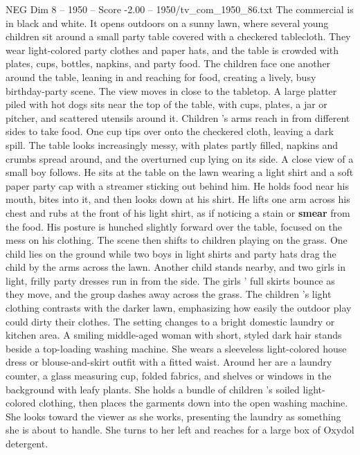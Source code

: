\begin{textsample}{NEG Dim 8 – 1950 – Score -2.00 – 1950/tv\_com\_1950\_86.txt}  \label{ex:f8_neg_028}
The commercial is in black and white.
It opens outdoors on a sunny lawn, where several young children sit around a small party table covered with a checkered tablecloth.
They wear light-colored party clothes and paper hats, and the table is crowded with plates, cups, bottles, napkins, and party food.
The children face one another around the table, leaning in and reaching for food, creating a lively, busy birthday-party scene.
The view moves in close to the tabletop.
A large platter piled with hot dogs sits near the top of the table, with cups, plates, a jar or pitcher, and scattered utensils around it.
Children ’s arms reach in from different sides to take food.
One cup tips over onto the checkered cloth, leaving a dark spill.
The table looks increasingly messy, with plates partly filled, napkins and crumbs spread around, and the overturned cup lying on its side.
A close view of a small boy follows.
He sits at the table on the lawn wearing a light shirt and a soft paper party cap with a streamer sticking out behind him.
He holds food near his mouth, bites into it, and then looks down at his shirt.
He lifts one arm across his chest and rubs at the front of his light shirt, as if noticing a stain or \textbf{smear} from the food.
His posture is hunched slightly forward over the table, focused on the mess on his clothing.
The scene then shifts to children playing on the grass.
One child lies on the ground while two boys in light shirts and party hats drag the child by the arms across the lawn.
Another child stands nearby, and two girls in light, frilly party dresses run in from the side.
The girls ’ full skirts bounce as they move, and the group dashes away across the grass.
The children ’s light clothing contrasts with the darker lawn, emphasizing how easily the outdoor play could dirty their clothes.
The setting changes to a bright domestic laundry or kitchen area.
A smiling middle-aged woman with short, styled dark hair stands beside a top-loading washing machine.
She wears a sleeveless light-colored house dress or blouse-and-skirt outfit with a fitted waist.
Around her are a laundry counter, a glass measuring cup, folded fabrics, and shelves or windows in the background with leafy plants.
She holds a bundle of children ’s soiled light-colored clothing, then places the garments down into the open washing machine.
She looks toward the viewer as she works, presenting the laundry as something she is about to handle.
She turns to her left and reaches for a large box of Oxydol detergent.

\end{textsample}
